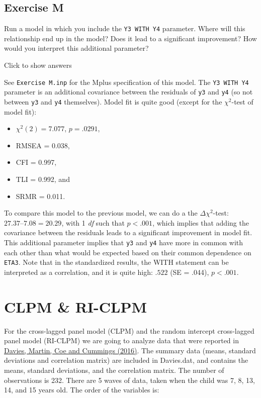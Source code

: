 \documentclass[
]{book}
\providecommand{\tightlist}{%
  \setlength{\itemsep}{0pt}\setlength{\parskip}{0pt}}
\begin{document}
\hypertarget{exercise-m}{%
\subsection{Exercise M}\label{exercise-m}}

Run a model in which you include the \texttt{Y3\ WITH\ Y4} parameter. Where will this relationship end up in the model? Does it lead to a significant improvement? How would you interpret this additional parameter?

Click to show answers

See \texttt{Exercise\ M.inp} for the Mplus specification of this model. The \texttt{Y3\ WITH\ Y4} parameter is an additional covariance between the residuals of \texttt{y3} and \texttt{y4} (so not between \texttt{y3} and \texttt{y4} themselves). Model fit is quite good (except for the \(\chi^{2}\)-test of model fit):

\begin{itemize}
\tightlist
\item
  \(\chi^{2} (2) = 7.077\), \(p = .0291\),
\item
  RMSEA = 0.038,
\item
  CFI = 0.997,
\item
  TLI = 0.992, and
\item
  SRMR = 0.011.
\end{itemize}

To compare this model to the previous model, we can do a the \(\Delta \chi^{2}\)-test: \(27.37 – 7.08 = 20.29\), with 1 \emph{df} such that \(p < .001\), which implies that adding the covariance between the residuals leads to a significant improvement in model fit. This additional parameter implies that \texttt{y3} and \texttt{y4} have more in common with each other than what would be expected based on their common dependence on \texttt{ETA3}. Note that in the standardized results, the WITH statement can be interpreted as a correlation, and it is quite high: \(.522\) (SE = .044), \(p < .001\).

\hypertarget{clpm-ri-clpm}{%
\section{CLPM \& RI-CLPM}\label{clpm-ri-clpm}}

For the cross-lagged panel model (CLPM) and the random intercept cross-lagged panel model (RI-CLPM) we are going to analyze data that were reported in \href{10.1017/S0954579416000237}{Davies, Martin, Coe and Cummings (2016)}. The summary data (means, standard deviations and correlation matrix) are included in Davies.dat, and contains the means, standard deviations, and the correlation matrix. The number of observations is 232. There are 5 waves of data, taken when the child was 7, 8, 13, 14, and 15 years old. The order of the variables is:
\end{document}
